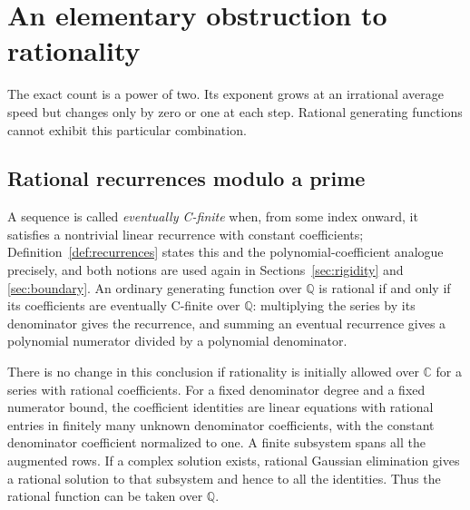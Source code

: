 \documentclass[11pt,letterpaper]{article}
\numberwithin{equation}{section}
\theoremstyle{definition}
\theoremstyle{remark}
\newcommand{\Q}{\mathbb{Q}}
\newcommand{\C}{\mathbb{C}}
\begin{document}
\section{An elementary obstruction to rationality}\label{sec:nonrational}

The exact count is a power of two. Its exponent grows at an irrational
average speed but changes only by zero or one at each step. Rational
generating functions cannot exhibit this particular combination.

\subsection{Rational recurrences modulo a prime}
A sequence is called \emph{eventually C-finite} when, from some index
onward, it satisfies a nontrivial linear recurrence with constant
coefficients; Definition~\ref{def:recurrences} states this and the
polynomial-coefficient analogue precisely, and both notions are used again
in Sections~\ref{sec:rigidity} and \ref{sec:boundary}. An ordinary
generating function over $\Q$ is rational if and only if its coefficients
are eventually C-finite over $\Q$: multiplying the series by its denominator gives
the recurrence, and summing an eventual recurrence gives a polynomial
numerator divided by a polynomial denominator.

There is no change in this conclusion if rationality is initially allowed
over $\C$ for a series with rational coefficients. For a fixed denominator
degree and a fixed numerator bound, the coefficient identities are linear
equations with rational entries in finitely many unknown denominator
coefficients, with the constant denominator coefficient normalized to one.
A finite subsystem spans all the augmented rows. If a complex solution
exists, rational Gaussian elimination gives a rational solution to that
subsystem and hence to all the identities. Thus the rational function can
be taken over $\Q$.
\end{document}
